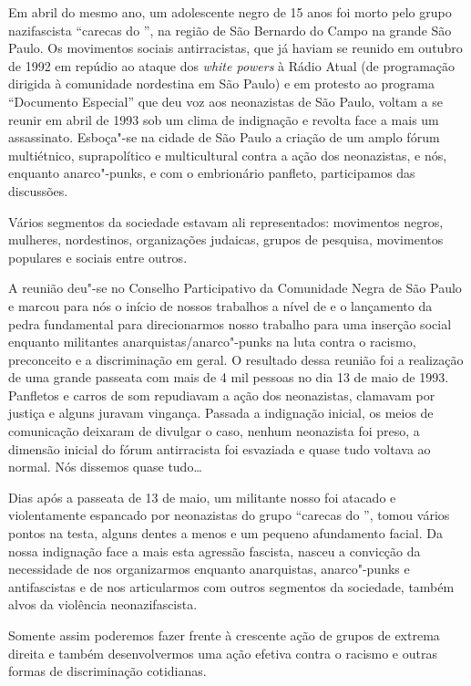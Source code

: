 Em abril do mesmo ano, um adolescente negro de 15 anos foi morto pelo grupo nazifascista ``carecas do '', na região de São Bernardo do Campo na grande São Paulo.
Os movimentos sociais antirracistas, que já haviam se reunido em outubro de 1992 em repúdio ao ataque dos \emph{white powers} à Rádio Atual (de programação dirigida à comunidade nordestina em São Paulo) e em protesto ao programa ``Documento Especial'' que deu voz aos neonazistas de São Paulo, voltam a se reunir em abril de 1993 sob um clima de indignação e revolta face a mais um assassinato. Esboça"-se na cidade de São Paulo a criação de um amplo fórum multiétnico, suprapolítico e multicultural contra a ação dos neonazistas, e nós, enquanto anarco"-punks, e com o embrionário panfleto, participamos das discussões.

Vários segmentos da sociedade estavam ali representados: movimentos negros, mulheres, nordestinos, organizações judaicas, grupos de pesquisa, movimentos populares e sociais entre outros.

A reunião deu"-se no Conselho Participativo da Comunidade Negra de São Paulo e marcou para nós o início de nossos trabalhos a nível de  e o lançamento da pedra fundamental para direcionarmos nosso trabalho para uma inserção social enquanto militantes anarquistas/anarco"-punks na luta contra o racismo, preconceito e a discriminação em geral.
O resultado dessa reunião foi a realização de uma grande passeata com mais de 4 mil pessoas no dia 13 de maio de 1993. Panfletos e carros de som repudiavam a ação dos neonazistas, clamavam por justiça e alguns juravam vingança.
Passada a indignação inicial, os meios de comunicação deixaram de divulgar o caso, nenhum neonazista foi preso, a dimensão inicial do fórum antirracista foi esvaziada e quase tudo voltava ao normal. Nós dissemos quase tudo\ldots{}

Dias após a passeata de 13 de maio, um militante nosso foi atacado e violentamente espancado por neonazistas do grupo ``carecas do '', tomou vários pontos na testa, alguns dentes a menos e um pequeno afundamento facial.
Da nossa indignação face a mais esta agressão fascista, nasceu a convicção da necessidade de nos organizarmos enquanto anarquistas, anarco"-punks e antifascistas e de nos articularmos com outros segmentos da sociedade, também alvos da violência neonazifascista.

Somente assim poderemos fazer frente à crescente ação de grupos de extrema direita e também desenvolvermos uma ação efetiva contra o racismo e outras formas de discriminação cotidianas.

